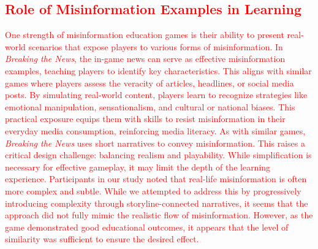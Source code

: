 \textcolor{red}{\subsection{Role of Misinformation Examples in Learning}
One strength of misinformation education games is their ability to present real-world scenarios that expose players to various forms of misinformation. In \textit{Breaking the News}, the in-game news can serve as effective misinformation examples, teaching players to identify key characteristics. This aligns with similar games where players assess the veracity of articles, headlines, or social media posts\cite{roozenbeek2019fake,katsaounidou2019mathe,micallef2021fakey}. By simulating real-world content, players learn to recognize strategies like emotional manipulation, sensationalism, and cultural or national biases. This practical exposure equips them with skills to resist misinformation in their everyday media consumption, reinforcing media literacy.
As with similar games, \textit{Breaking the News} uses %
short narratives to convey misinformation. This raises a critical design challenge: balancing realism and playability. While simplification is necessary for effective gameplay, it may limit the depth of the learning experience. Participants in our study noted that real-life misinformation is often more complex and subtle. While we attempted to address this by progressively introducing complexity through storyline-connected narratives, it seems that the approach did not fully mimic the realistic flow of misinformation. However, as the game demonstrated good educational outcomes, it appears that the level of similarity was sufficient to ensure the desired effect. }




